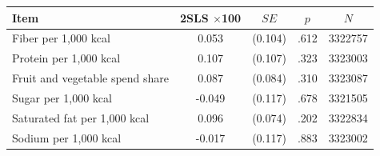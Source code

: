\begin{tabular}{
    l
    S[table-format=-1.3]
    S[table-format=1.3, table-space-text-pre={(}, table-align-text-before=false, table-space-text-post={)}, table-align-text-after=false]
    S[table-format=1.3, print-zero-integer=false]
    S[table-format=9]
}
\toprule
Item & {2SLS \(\times\)100} & {\(\mathit{SE}\)} & {\(p\)} & {\(N\)} \\
\midrule
Fiber per 1,000 kcal & 0.053 & {(}0.104{)} & .612 & 3322757 \\
Protein per 1,000 kcal & 0.107 & {(}0.107{)} & .323 & 3323003 \\
Fruit and vegetable spend share & 0.087 & {(}0.084{)} & .310 & 3323087 \\
Sugar per 1,000 kcal & -0.049 & {(}0.117{)} & .678 & 3321505 \\
Saturated fat per 1,000 kcal & 0.096 & {(}0.074{)} & .202 & 3322834 \\
Sodium per 1,000 kcal & -0.017 & {(}0.117{)} & .883 & 3323002 \\
\bottomrule
\end{tabular}
